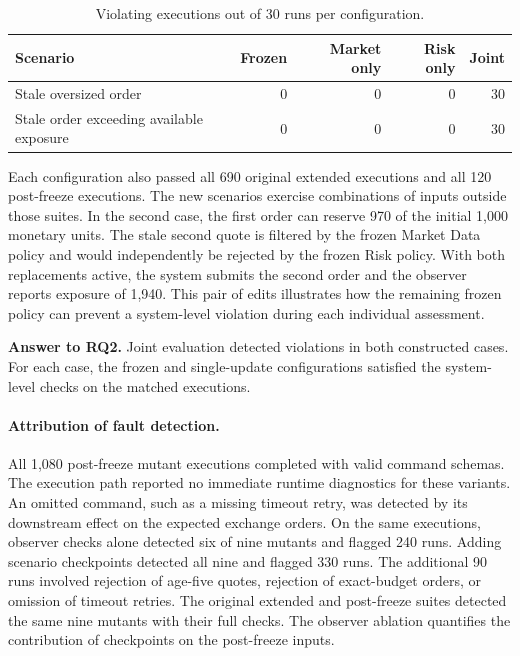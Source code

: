 \begin{table}[ht]
\centering
\caption{Violating executions out of 30 runs per configuration.}
\label{tab:paired-policy-updates}
\begin{tabular}{lrrrr}
\hline
Scenario & Frozen & Market only & Risk only & Joint \\
\hline
Stale oversized order & 0 & 0 & 0 & 30 \\
Stale order exceeding available exposure & 0 & 0 & 0 & 30 \\
\hline
\end{tabular}
\end{table}

Each configuration also passed all 690 original extended executions
and all 120 post-freeze executions. The new scenarios exercise
combinations of inputs outside those suites. In the second case,
the first order can reserve 970 of the initial 1,000 monetary units.
The stale second quote is filtered by the frozen Market Data policy
and would independently be rejected by the frozen Risk policy.
With both replacements active, the system submits the second order
and the observer reports exposure of 1,940. This pair of edits
illustrates how the remaining frozen policy can prevent a system-level
violation during each individual assessment.

\textbf{Answer to RQ2.}
Joint evaluation detected violations in both constructed cases.
For each case, the frozen and single-update configurations satisfied
the system-level checks on the matched executions.

\paragraph{Attribution of fault detection.}
All 1,080 post-freeze mutant executions completed with valid command
schemas. The execution path reported no immediate runtime diagnostics
for these variants. An omitted command, such as a missing timeout retry,
was detected by its downstream effect on the expected exchange orders.
On the same executions, observer checks alone detected six of nine
mutants and flagged 240 runs. Adding scenario checkpoints detected all
nine and flagged 330 runs. The additional 90 runs involved rejection
of age-five quotes, rejection of exact-budget orders, or omission of
timeout retries. The original extended and post-freeze suites detected
the same nine mutants with their full checks. The observer ablation
quantifies the contribution of checkpoints on the post-freeze inputs.

